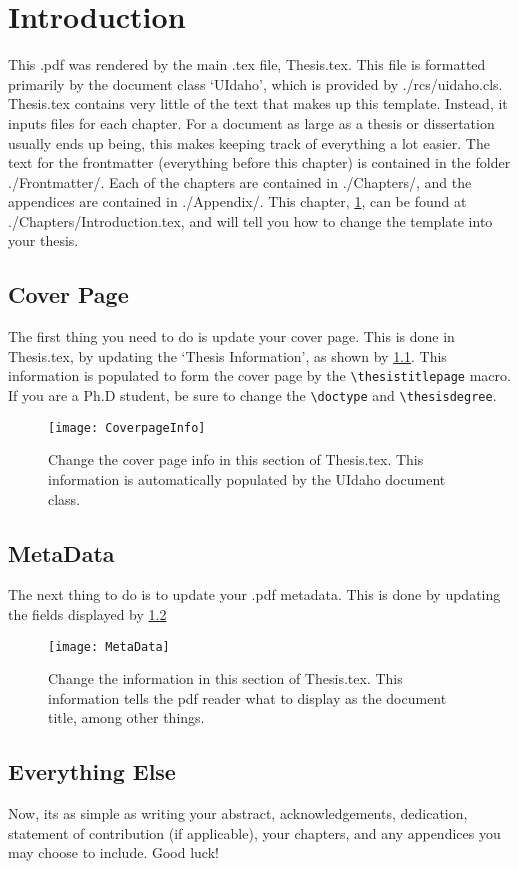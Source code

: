 \chapter{Introduction}
\label{Chapter:Intro}

This .pdf was rendered by the main .tex file, Thesis.tex. This file is formatted primarily by the document class `UIdaho', which is provided by ./rcs/uidaho.cls. Thesis.tex contains very little of the text that makes up this template. Instead, it inputs files for each chapter. For a document as large as a thesis or dissertation usually ends up being, this makes keeping track of everything a lot easier. The text for the frontmatter (everything before this chapter) is contained in the folder ./Frontmatter/. Each of the chapters are contained in ./Chapters/, and the appendices are contained in ./Appendix/. This chapter, \cref{Chapter:Intro}, can be found at ./Chapters/Introduction.tex, and will tell you how to change the template into your thesis.

\section{Cover Page}\label{Section:Intro-Cover}
The first thing you need to do is update your cover page. This is done in Thesis.tex, by updating the `Thesis Information', as shown by \cref{Fig:CoverPage}. This information is populated to form the cover page by the \verb|\thesistitlepage| macro. If you are a Ph.D student, be sure to change the \verb|\doctype| and \verb|\thesisdegree|.

\begin{figure}[h!]
    \centering
    \texttt{[image: CoverpageInfo]}
    \caption[Cover Page Info]{Change the cover page info in this section of Thesis.tex. This information is automatically populated by the UIdaho document class.}
    \label{Fig:CoverPage}
\end{figure}

\section{MetaData}
\label{Section:Intro-MetaData}

The next thing to do is to update your .pdf metadata. This is done by updating the fields displayed by \cref{Fig:MetaData}

\begin{figure}[h!]
    \centering
    \texttt{[image: MetaData]}
    \caption[MetaData]{Change the information in this section of Thesis.tex. This information tells the pdf reader what to display as the document title, among other things.}
    \label{Fig:MetaData}
\end{figure}

\section{Everything Else}
\label{Section:Intro-Else}

Now, its as simple as writing your abstract, acknowledgements, dedication, statement of contribution (if applicable), your chapters, and any appendices you may choose to include. Good luck! 